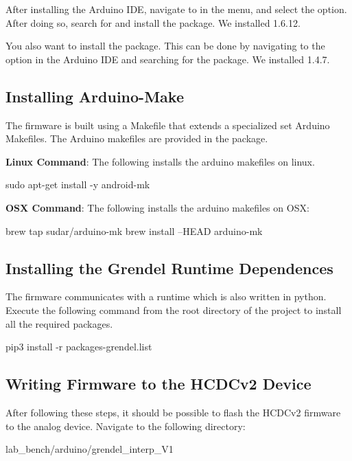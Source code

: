 After installing the Arduino IDE, navigate to  in the menu, and select the 
option. After doing so, search for  and install the  package.
We installed 1.6.12.

You also want to install the  package. This can be done by navigating to the 
 option in the Arduino IDE and searching for the  package.
We installed 1.4.7.

\subsection{Installing Arduino-Make}
The firmware is built using a Makefile that extends a specialized set Arduino
Makefiles. The Arduino makefiles are provided in the  package.

\noindent\textbf{Linux Command}: The following installs the arduino makefiles on linux.
\begin{snippet}
sudo apt-get install -y  android-mk
\end{snippet}

\noindent\textbf{OSX Command}: The following installs the arduino makefiles on OSX:

\begin{snippet}
brew tap sudar/arduino-mk
brew install --HEAD arduino-mk
\end{snippet}

\subsection{Installing the Grendel Runtime Dependences}


The firmware communicates with a runtime which is also written in python.
Execute the following command from the root directory of the 
project to install all the required packages.

\begin{snippet}
  pip3 install -r packages-grendel.list
\end{snippet}

\subsection{Writing Firmware to the HCDCv2 Device}
After following these steps, it should be possible to flash the HCDCv2 firmware to the analog device. Navigate
to the following directory:
\begin{snippet}
lab_bench/arduino/grendel_interp_V1
\end{snippet}

